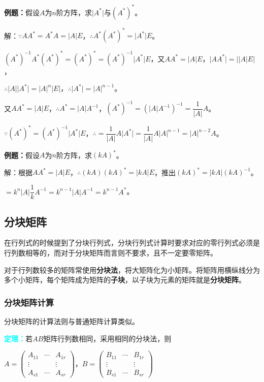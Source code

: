 \documentclass[UTF8, 12pt]{ctexart}
\begin{document}
\textbf{例题：}假设$A$为$n$阶方阵，求$\vert A^*\vert$与$(A^*)^*$。

解：$\because AA^*=A^*A=\vert A\vert E$，$\therefore A^*(A^*)^*=\vert A^*\vert E$。

$(A^*)^{-1}A^*(A^*)^*=(A^*)^*=(A^*)^{-1}\vert A^*\vert E$，又$AA^*=\vert A\vert E$，$\vert AA^*\vert=\vert\vert A\vert E\vert$，

$\therefore\vert A\vert\vert A^*\vert=\vert A\vert^n\vert E\vert$，$\therefore\vert A^*\vert=\vert A\vert^{n-1}$。

又$AA^*=\vert A\vert E$，$\therefore A^*=\vert A\vert A^{-1}$，$(A^*)^{-1}=(\vert A\vert A^{-1})^{-1}=\dfrac{1}{\vert A\vert}A$。

$\because(A^*)^*=(A^*)^{-1}\vert A^*\vert E$，$\therefore=\dfrac{1}{\vert A\vert}A\vert A^*\vert=\dfrac{1}{\vert A\vert}A\vert A\vert^{n-1}=\vert A\vert^{n-2}A$。

\textbf{例题：}假设$A$为$n$阶方阵，求$(kA)^*$。

解：根据$AA^*=\vert A\vert E$，$\therefore (kA)(kA)^*=\vert kA\vert E$，推出$(kA)^*=\vert kA\vert(kA)^{-1}$。

$=k^n\vert A\vert\dfrac{1}{k}A^{-1}=k^{n-1}\vert A\vert A^{-1}=k^{n-1}A^*$。

\subsection{分块矩阵}

在行列式的时候提到了分块行列式，分块行列式计算时要求对应的零行列式必须是行列数相等的，而对于分块矩阵而言则不要求，且不一定要零矩阵。

对于行列数较多的矩阵常使用\textbf{分块法}，将大矩阵化为小矩阵。将矩阵用横纵线分为多个小矩阵，每个矩阵成为矩阵的\textbf{子块}，以子块为元素的矩阵就是\textbf{分块矩阵}。

\subsubsection{分块矩阵计算}

分块矩阵的计算法则与普通矩阵计算类似。

\textcolor{aqua}{\textbf{定理：}}若$AB$矩阵行列数相同，采用相同的分块法，则 \medskip

$A=\left(
\begin{array}{ccc}
A_{11} & \cdots & A_{1r} \\
\vdots & & \vdots \\
A_{s1} & \cdots & A_{sr}
\end{array}
\right)\text{，}B=\left(
\begin{array}{ccc}
B_{11} & \cdots & B_{1r} \\
\vdots & & \vdots \\
B_{s1} & \cdots & B_{sr}
\end{array}
\right)$
\end{document}
